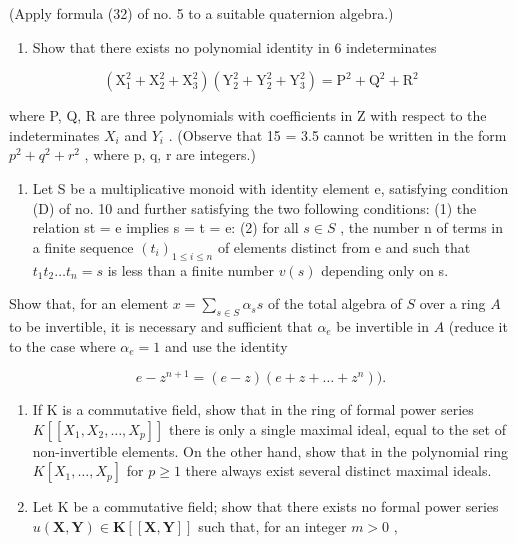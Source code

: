 (Apply formula (32) of no. 5 to a suitable quaternion algebra.)

\begin{enumerate}
\def\labelenumi{\arabic{enumi}.}
\setcounter{enumi}{19}
\tightlist
\item
  Show that there exists no polynomial identity in 6 indeterminates
\end{enumerate}

\[
(\mathrm{X} _ {1} ^ {2} + \mathrm{X} _ {2} ^ {2} + \mathrm{X} _ {3} ^ {2}) (\mathrm{Y} _ {2} ^ {2} + \mathrm{Y} _ {2} ^ {2} + \mathrm{Y} _ {3} ^ {2}) = \mathrm{P} ^ {2} + \mathrm{Q} ^ {2} + \mathrm{R} ^ {2}
\]

where P, Q, R are three polynomials with coefficients in Z with respect to the indeterminates \(X_{i}\) and \(Y_{i}\) . (Observe that 15 = 3.5 cannot be written in the form \(p^{2} + q^{2} + r^{2}\) , where p, q, r are integers.)

\begin{enumerate}
\def\labelenumi{\arabic{enumi}.}
\setcounter{enumi}{20}
\tightlist
\item
  Let S be a multiplicative monoid with identity element e, satisfying condition (D) of no. 10 and further satisfying the two following conditions: (1) the relation st = e implies s = t = e: (2) for all \(s \in S\) , the number n of terms in a finite sequence \((t_{i})_{1 \leq i \leq n}\) of elements distinct from e and such that \(t_{1}t_{2} \ldots t_{n} = s\) is less than a finite number \(v(s)\) depending only on s.
\end{enumerate}

Show that, for an element \(x = \sum_{s \in S} \alpha_s s\) of the total algebra of \(S\) over a ring \(A\) to be invertible, it is necessary and sufficient that \(\alpha_e\) be invertible in \(A\) (reduce it to the case where \(\alpha_e = 1\) and use the identity

\[
e - z ^ {n + 1} = (e - z) (e + z + \dots + z ^ {n})).
\]

\begin{enumerate}
\def\labelenumi{\arabic{enumi}.}
\setcounter{enumi}{21}
\item
  If K is a commutative field, show that in the ring of formal power series \(K[[X_{1}, X_{2}, \ldots, X_{p}]]\) there is only a single maximal ideal, equal to the set of non-invertible elements. On the other hand, show that in the polynomial ring \(K[X_{1}, \ldots, X_{p}]\) for \(p \geqslant 1\) there always exist several distinct maximal ideals.
\item
  Let K be a commutative field; show that there exists no formal power series \(u(\mathbf{X}, \mathbf{Y}) \in \mathbf{K}[[\mathbf{X}, \mathbf{Y}]]\) such that, for an integer \(m > 0\) ,
\end{enumerate}

